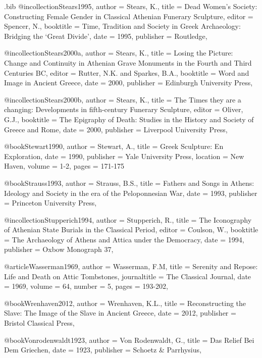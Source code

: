 \begin{filecontents}{\IJSRAidentifier.bib}
	@incollection{Stears1995,
		author = {Stears, K.},
		title = {Dead Women’s Society: Constructing Female Gender in Classical Athenian Funerary Sculpture},
		editor = {Spencer, N.},
		booktitle = {Time, Tradition and Society in Greek Archaeology: Bridging the \enquote*{Great Divide}},
		date = {1995},
		publisher = {Routledge},
	}

	@incollection{Stears2000a,
		author = {Stears, K.},
		title = {Losing the Picture: Change and Continuity in Athenian Grave Monuments in the Fourth and Third Centuries BC},
		editor = {Rutter, N.K. and Sparkes, B.A.},
		booktitle = {Word and Image in Ancient Greece},
		date = {2000},
		publisher = {Edinburgh University Press},
	}

	@incollection{Stears2000b,
		author = {Stears, K.},
		title = {The Times they are a changing: Developments in fifth-century Funerary Sculpture},
		editor = {Oliver, G.J.},
		booktitle = {The Epigraphy of Death: Studies in the History and Society of Greece and Rome},
		date = {2000},
		publisher = {Liverpool University Press},
	}

		@book{Stewart1990,
		author = {Stewart, A.},
		title = {Greek Sculpture: En Exploration},
		date = {1990},
		publisher = {Yale University Press},
		location = {New Haven},
		volume = {1-2},
		pages = {171-175}
	}

	@book{Strauss1993,
		author = {Strauss, B.S.},
		title = {Fathers and Songs in Athens: Ideology and Society in the era of the Peloponnesian War},
		date = {1993},
		publisher = {Princeton University Press},
	}

	@incollection{Stupperich1994,
		author = {Stupperich, R.},
		title = {The Iconography of Athenian State Burials in the Classical Period},
		editor = {Coulson, W.},
		booktitle = {The Archaeology of Athens and Attica under the Democracy},
		date = {1994},
		publisher = {Oxbow Monograph 37},
	}

	@article{Wasserman1969,
		author = {Wasserman, F.M},
		title = {Serenity and Repose: Life and Death on Attic Tombstones},
		journaltitle = {The Classical Journal},
		date = {1969},
		volume = {64},
		number = {5},
		pages = {193-202},
	}

	@book{Wrenhaven2012,
		author = {Wrenhaven, K.L.},
		title = {Reconstructing the Slave: The Image of the Slave in Ancient Greece},
		date = {2012},
		publisher = {Bristol Classical Press},
	}

	@book{Vonrodenwaldt1923,
		author = {Von Rodenwaldt, G.},
		title = {Das Relief Bei Dem Griechen},
		date = {1923},
		publisher = {Schoetz \& Parrhysius},
	}


\end{filecontents}
